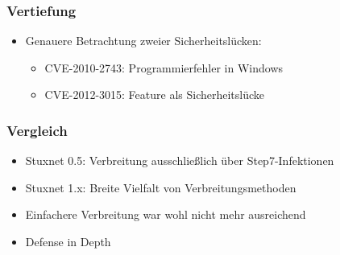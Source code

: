 \documentclass{beamer}
\begin{document}
\begin{frame}
  \frametitle{Vertiefung}
  \begin{itemize}
    \item Genauere Betrachtung zweier Sicherheitslücken:
      \begin{itemize}
        \item CVE-2010-2743: Programmierfehler in Windows
        \item CVE-2012-3015: Feature als Sicherheitslücke
      \end{itemize}
  \end{itemize}
\end{frame}

\begin{frame}
  \frametitle{Vergleich}
  \begin{itemize}
    \item Stuxnet 0.5: Verbreitung ausschließlich über Step7-Infektionen
    \item Stuxnet 1.x: Breite Vielfalt von Verbreitungsmethoden
    \item Einfachere Verbreitung war wohl nicht mehr ausreichend
    \item Defense in Depth
  \end{itemize}
\end{frame}
\end{document}
